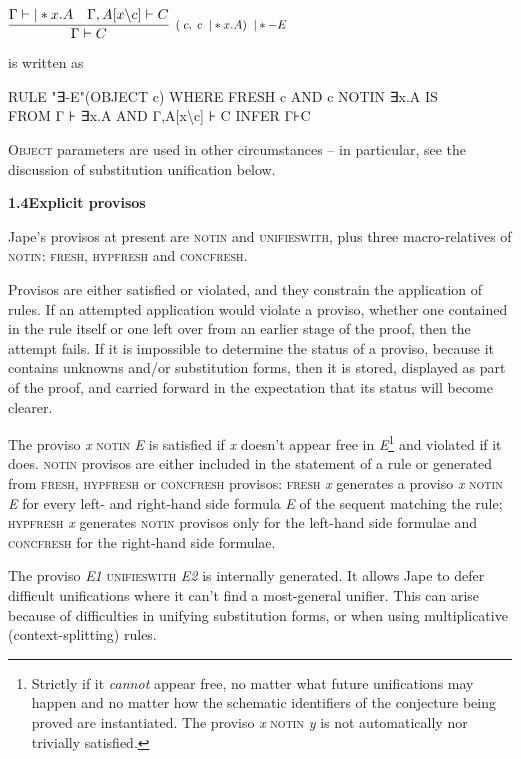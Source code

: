 \documentclass[11pt]{book}
\newcommand{\tab}{\hspace{5mm}}
\newcommand{\reason}[1]{\scalebox{0.85}{#1}}
\begin{document}
$\infer[\reason{$(\;c,\;c\;\;|*x.A)\;\;|*-E$}]
       {\Gamma |- C}
       {\Gamma  |-|*x.A\quad \Gamma,A[x\backslash c] |- C}$

is written as

RULE "∃-E"(OBJECT c) WHERE FRESH c AND c NOTIN ∃x.A IS \\
\tab FROM Γ ⊦ ∃x.A AND Γ,A[x{\textbackslash}c] ⊦ C INFER Γ⊦C


\textsc{Object} parameters are used in other circumstances -- in particular, see the discussion of substitution unification below.


\textbf{{\large 1.4\tab Explicit provisos}}


Jape's provisos at present are \textsc{notin} and \textsc{unifieswith}, plus three macro-relatives of \textsc{notin}: \textsc{fresh, hypfresh} and \textsc{concfresh}.


Provisos are either satisfied or violated, and they constrain the application of rules. If an attempted application would violate a proviso, whether one contained in the rule itself or one left over from an earlier stage of the proof, then the attempt fails. If it is impossible to determine the status of a proviso, because it contains unknowns and/or substitution forms, then it is stored, displayed as part of the proof, and carried forward in the expectation that its status will become clearer.


The proviso \textit{x} \textsc{notin} \textit{E} is satisfied if \textit{x} doesn't appear free in \textit{E}\footnote{Strictly if it \textit{cannot} appear free, no matter what future unifications may happen and no matter how the schematic identifiers of the conjecture being proved are instantiated. The proviso \textit{x} \textsc{notin} \textit{y} is not automatically nor trivially satisfied.} and violated if it does. \textsc{notin} provisos are either included in the statement of a rule or generated from \textsc{fresh, hypfresh} or \textsc{concfresh} provisos: \textsc{fresh} \textit{x} generates a proviso \textit{x} \textsc{notin} \textit{E} for every left- and right-hand side formula \textit{E} of the sequent matching the rule; \textsc{hypfresh} \textit{x} generates \textsc{notin} provisos only for the left-hand side formulae and \textsc{concfresh} for the right-hand side formulae.


The proviso \textit{E1} \textsc{unifieswith} \textit{\textsc{E2}} is internally generated. It allows Jape to defer difficult unifications where it can't find a most-general unifier. This can arise because of difficulties in unifying substitution forms, or when using multiplicative (context-splitting) rules.
\end{document}
